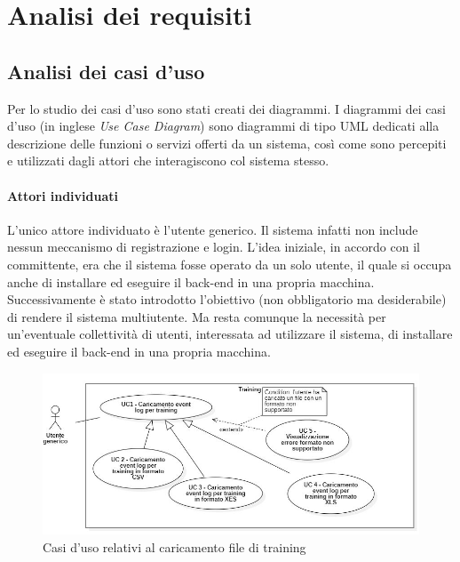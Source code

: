 
\chapter{Analisi dei requisiti}
\label{cap4}
 

\section{Analisi dei casi d'uso}

Per lo studio dei casi d'uso sono stati creati dei diagrammi.
I diagrammi dei casi d'uso (in inglese \emph{Use Case Diagram}) sono diagrammi di tipo \gls{UML} dedicati alla descrizione delle funzioni o servizi offerti da un sistema, così come sono percepiti e utilizzati dagli attori che interagiscono col sistema stesso.

\subsubsection{Attori individuati}
L'unico attore individuato è l'utente generico. Il sistema infatti non include nessun meccanismo di registrazione e login. L'idea iniziale, in accordo con il committente, era che il sistema fosse operato da un solo utente, il quale si occupa anche di installare ed eseguire il back-end in una propria macchina. 
\\
Successivamente è stato introdotto l'obiettivo (non obbligatorio ma desiderabile) di rendere il sistema multiutente. Ma resta comunque la necessità per un'eventuale collettività di utenti, interessata ad utilizzare il sistema, di installare ed eseguire il back-end in una propria macchina.
\clearpage


\begin{figure}[H]
    \centering
    \includegraphics[scale=0.6]{immagini/usecase/cd1.JPG}
    \caption{Casi d'uso relativi al caricamento file di training}
\end{figure}

